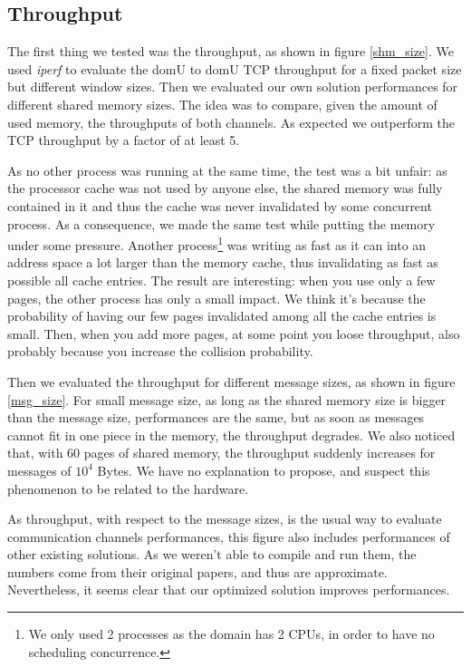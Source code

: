\documentclass[journal]{IEEEtran}
\begin{document}
\subsection{Throughput}
\label{section:throughput}



The first thing we tested was the throughput, as shown in figure \ref{shm_size}. We used \emph{iperf} to evaluate the domU to domU TCP throughput for a fixed packet size but different window sizes. Then we evaluated our own solution performances for different shared memory sizes. 
The idea was to compare, given the amount of used memory, the throughputs of both channels.
As expected we outperform the TCP throughput by a factor of at least 5.



As no other process was running at the same time, the test was a bit unfair: as the processor cache was not used by anyone else, the shared memory was fully contained in it and thus the cache was never invalidated by some concurrent process. As a consequence, we made the same test while putting the memory under some pressure. Another process\footnote{We only used 2 processes as the domain has 2 CPUs, in order to have no scheduling concurrence.} was writing as fast as it can into an address space a lot larger than the memory cache, thus invalidating as fast as possible all cache entries. The result are interesting: when you use only a few pages, the other process has only a small impact. We think it's because the probability of having our few pages invalidated among all the cache entries is small. Then, when you add more pages, at some point you loose throughput, also probably because you increase the collision probability.



Then we evaluated the throughput for different message sizes, as shown in figure \ref{msg_size}. 
For small message size, as long as the shared memory size is bigger than the message size, performances are the same, but as soon as messages cannot fit in one piece in the memory, the throughput degrades. We also noticed that, with 60 pages of shared memory, the throughput suddenly increases for messages of $10^4$ Bytes. We have no explanation to propose, and suspect this phenomenon to be related to the hardware. 

As throughput, with respect to the message sizes, is the usual way to evaluate communication channels performances, this figure also includes performances of other existing solutions. As we weren't able to compile and run them, the numbers come from their original papers, and thus are approximate. Nevertheless, it seems clear that our optimized solution improves performances.
\end{document}
